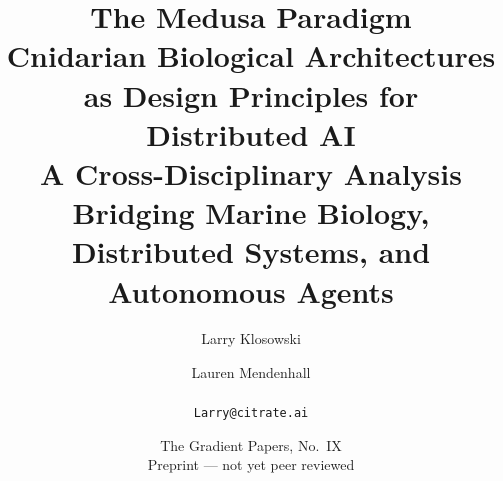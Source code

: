 
\title{\textbf{The Medusa Paradigm}\\[3pt]
\large Cnidarian Biological Architectures as Design Principles for Distributed AI\\[2pt]
\normalsize A Cross-Disciplinary Analysis Bridging Marine Biology, Distributed Systems, and Autonomous Agents}
\author{Larry Klosowski \and Lauren Mendenhall\\[2pt]\CitrateAffil\\ \texttt{Larry@citrate.ai}}
\date{The Gradient Papers, No.~IX \\ Preprint --- not yet peer reviewed}
\maketitle
